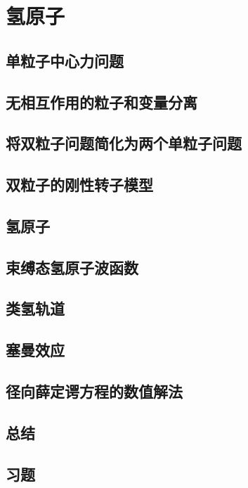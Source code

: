 \chapter{氢原子}
\section{单粒子中心力问题}

\section{无相互作用的粒子和变量分离}

\section{将双粒子问题简化为两个单粒子问题}

\section{双粒子的刚性转子模型}

\section{氢原子}

\section{束缚态氢原子波函数}

\section{类氢轨道}

\section{塞曼效应}

\section{径向薛定谔方程的数值解法}

\section*{总结}

\section*{习题}
